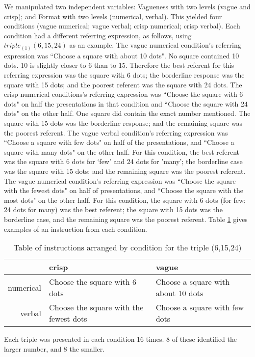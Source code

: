 \documentclass[doc,floatmark]{apa}
\begin{document}
We manipulated two independent variables: Vagueness with two levels (vague and crisp); and Format with two levels (numerical, verbal). This yielded four conditions (vague numerical; vague verbal; crisp numerical; crisp verbal). Each condition had a different referring expression, as follows, using $triple_{(1)}(6,15,24)$ as an example. 
The vague numerical condition's referring expression was ``Choose a square with about 10 dots". No square contained 10 dots. 10 is slightly closer to 6 than to 15. Therefore the best referent for this referring expression was the square with 6 dots;  the borderline response was the square with 15 dots; and the poorest referent was the square with 24 dots. The crisp numerical conditions's referring expression was ``Choose the square with 6 dots" on half the presentations in that condition and ``Choose the square with 24 dots" on the other half. One square did contain the exact number mentioned. The square with 15 dots was the borderline response; and the remaining square was the poorest referent. The vague verbal condition's referring expression was ``Choose a square with few dots" on half of the presentations, and ``Choose a square with many dots" on the other half. For this condition, the best referent was the square with 6 dots for `few' and 24 dots for 'many'; the borderline case was the square with 15 dots; and the remaining square was the poorest referent. The vague numerical condition's referring expression was ``Choose the square with the fewest dots" on half of presentations, and ``Choose the square with the most dots" on the other half. For this condition, the square with 6 dots (for few; 24 dots for many) was the best referent; the square with 15 dots was the borderline case, and the remaining square was the poorest referent. Table \ref{instre3} gives examples of an instruction from each condition.


\begin{table}[tbp]
\caption{Table of instructions arranged by condition for the triple (6,15,24)}
\label{instre3}
\begin{tabular}{rll}
&crisp&vague\\
\hline
numerical&Choose the square with 6 dots 		& 	Choose a square with about 10 dots			\\
verbal&Choose the square with the fewest dots			&		Choose a square with few dots\\
\end{tabular}
\end{table}

Each triple was presented in each condition 16 times. 8 of these identified the larger number, and 8 the smaller.
\end{document}
